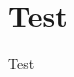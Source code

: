 \documentclass[class=article, crop=false]{standalone}
\begin{document}
\section{Test}
Test
\end{document}
